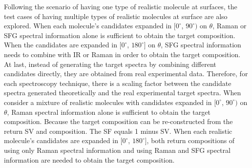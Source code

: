 Following the scenario of having one type of realistic molecule at surfaces, the test cases of having multiple types of realistic molecules at surface are also explored. When each molecule's candidates expanded in $[0^{\circ}$, $90^{\circ})$ on $\theta$, Raman or SFG spectral information alone is sufficient to obtain the target composition. When the candidates are expanded in $[0^{\circ}$, $180^{\circ}]$ on $\theta$, SFG spectral information needs to combine with IR or Raman in order to obtain the target composition. \\

At last, instead of generating the target spectra by combining different candidates directly, they are obtained from real experimental data. Therefore, for each spectroscopy technique, there is a scaling factor between the candidate spectra generated theoretically and the real experimental target spectra. When consider a mixture of realistic molecules with candidates expanded in $[0^{\circ}$, $90^{\circ})$ on $\theta$, Raman spectral information alone is sufficient to obtain the target composition. Because the target composition can be re-constructed from the return SV and composition. The SF equals 1 minus SV. When each realistic molecule's candidates are expanded in $[0^{\circ}$, $180^{\circ}]$, both return compositions of using only Raman spectral information and using Raman and SFG spectral information are needed to obtain the target composition. \\

